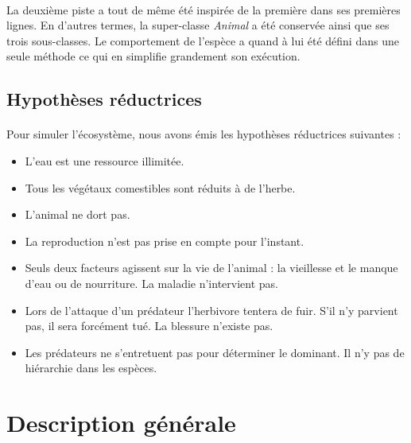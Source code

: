 \documentclass[a4paper,11pt,final,oneside]{article}
\begin{document}
\paragraph{} La deuxième piste a tout de même été inspirée de la première dans ses premières lignes. En d'autres termes, la super-classe \textit{Animal} a été conservée ainsi que ses trois sous-classes. Le comportement de l'espèce a quand à lui été défini dans une seule méthode ce qui en simplifie grandement son exécution.

		\subsection{Hypothèses réductrices}

\paragraph{} Pour simuler l'écosystème, nous avons émis les hypothèses réductrices suivantes :

\begin{itemize}
	\item L'eau est une ressource illimitée.
	\item Tous les végétaux comestibles sont réduits à de l'herbe. 
	\item L'animal ne dort pas.
	\item La reproduction n'est pas prise en compte pour l'instant.
	\item Seuls deux facteurs agissent sur la vie de l'animal : la vieillesse et le manque d'eau ou de nourriture. La maladie n'intervient pas.
	\item Lors de l'attaque d'un prédateur l'herbivore tentera de fuir. S'il n'y parvient pas, il sera forcément tué. La blessure n'existe pas.
	\item Les prédateurs ne s'entretuent pas pour déterminer le dominant. Il n'y pas de hiérarchie dans les espèces.
\end{itemize}


	\section{Description générale}
	\label{sec:des}
\end{document}

